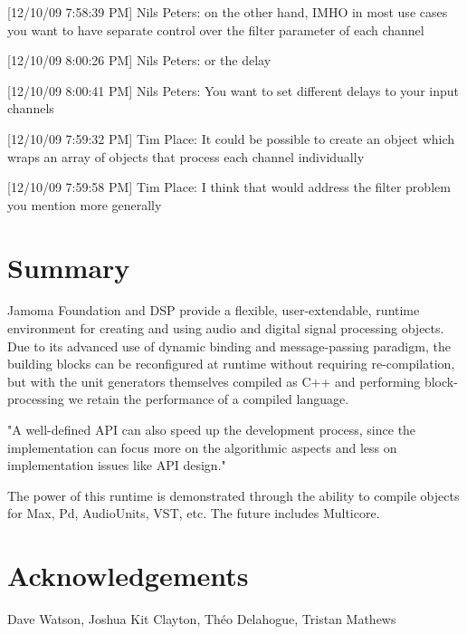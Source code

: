 \documentclass[twoside,10pt]{article}
\begin{document}
[12/10/09 7:58:39 PM] Nils Peters: on the other hand, IMHO in most use cases you want to have separate control over the filter parameter of each channel

[12/10/09 8:00:26 PM] Nils Peters: or the delay

[12/10/09 8:00:41 PM] Nils Peters: You want to set different delays to your input channels

[12/10/09 7:59:32 PM] Tim Place: It could be possible to create an object which wraps an array of objects that process each channel individually

[12/10/09 7:59:58 PM] Tim Place: I think that would address the filter problem you mention more generally





\section{Summary} %

Jamoma Foundation and DSP provide a flexible, user-extendable, runtime environment for creating and using audio and digital signal processing objects.  Due to its advanced use of dynamic binding and message-passing paradigm, the building blocks can be reconfigured at runtime without requiring re-compilation, but with the unit generators themselves compiled as C++ and performing block-processing we retain the performance of a compiled language.


"A well-defined API can also speed up the development process, since the implementation can focus more on the algorithmic aspects and less on implementation issues like API design." \cite{Lerch:2005}

The power of this runtime is demonstrated through the ability to compile objects for Max, Pd, AudioUnits, VST, etc.  The future includes Multicore.



\section{Acknowledgements} %

Dave Watson, Joshua Kit Clayton, Th\'eo Delahogue, Tristan Mathews




\end{document}
